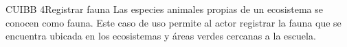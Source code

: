 
\begin{UseCase}{CUIBB 4}{Registrar fauna}
    {
	Las especies animales propias de un ecosistema se conocen como fauna. Este caso de uso permite al actor registrar la fauna que se encuentra ubicada en los ecosistemas y áreas verdes cercanas a la escuela.
    }
    
    


\end{UseCase}
